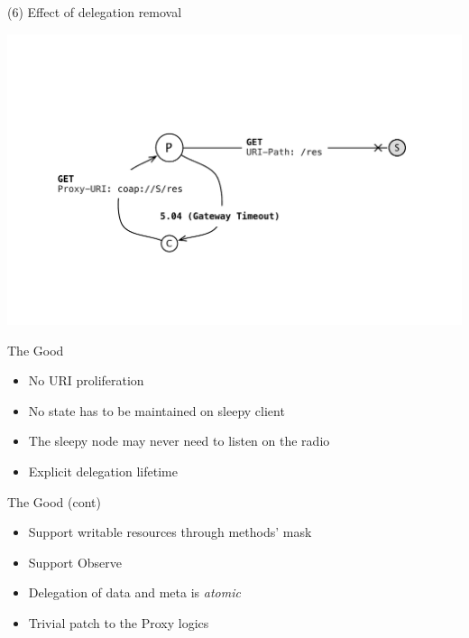 \documentclass{beamer}
\begin{document}
\begin{frame}{(6) Effect of delegation removal}
 \begin{center}
  \includegraphics[width=\textwidth]{../../share/images/publish5.pdf}
 \end{center}
\end{frame}

\begin{frame}{The Good}

\begin{itemize}
 \item No URI proliferation %
 \item No state has to be maintained on sleepy client
 \item The sleepy node may never need to listen on the radio
 \item Explicit delegation lifetime
\end{itemize}
\end{frame}

\begin{frame}{The Good (cont)}
\begin{itemize}
 \item Support writable resources through methods' mask
 \item Support Observe
 \item Delegation of data and meta is \emph{atomic}
 \item Trivial patch to the Proxy logics 
\end{itemize}
\end{frame}
\end{document}
